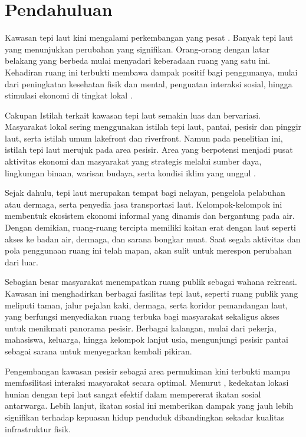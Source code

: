 \documentclass[../riset_senja.tex]{subfiles}
\begin{document}
\section{Pendahuluan}%
\label{sec:Pendahuluan}


Kawasan tepi laut kini mengalami perkembangan yang pesat \citep{tang2011}. Banyak tepi laut yang menunjukkan perubahan yang signifikan.
Orang-orang dengan latar belakang yang berbeda mulai menyadari keberadaan ruang yang satu ini. Kehadiran ruang ini terbukti membawa dampak positif bagi penggunanya, mulai dari peningkatan kesehatan fisik dan mental, penguatan interaksi sosial, hingga stimulasi ekonomi di tingkat lokal \citep{shi2025}.

Cakupan Istilah terkait kawasan tepi laut semakin luas dan bervariasi. Masyarakat lokal sering menggunakan istilah tepi laut, pantai, pesisir dan pinggir laut, serta istilah umum lakefront dan riverfront. Namun pada penelitian ini, istilah tepi laut merujuk pada area pesisir. Area yang berpotensi menjadi pusat aktivitas ekonomi dan masyarakat yang strategis melalui sumber daya, lingkungan binaan, warisan budaya, serta kondisi iklim yang unggul \citep{bhagwat1975,hoppe2011}.

Sejak dahulu, tepi laut merupakan tempat bagi nelayan, pengelola pelabuhan atau dermaga, serta penyedia jasa transportasi laut. Kelompok-kelompok ini membentuk ekosistem ekonomi informal yang dinamis dan bergantung pada air. Dengan demikian, ruang-ruang tercipta memiliki kaitan erat dengan laut seperti akses ke badan air, dermaga, dan sarana bongkar muat. Saat segala aktivitas dan pola penggunaan ruang ini telah mapan, akan sulit untuk merespon perubahan dari luar.

Sebagian besar masyarakat menempatkan ruang publik sebagai wahana rekreasi.
Kawasan ini menghadirkan berbagai fasilitas tepi laut, seperti ruang publik yang meliputi taman, jalur pejalan kaki, dermaga, serta koridor pemandangan laut, yang berfungsi menyediakan ruang terbuka bagi masyarakat sekaligus akses untuk menikmati panorama pesisir.
Berbagai kalangan, mulai dari pekerja, mahasiswa, keluarga, hingga kelompok lanjut usia, mengunjungi pesisir pantai sebagai sarana untuk menyegarkan kembali pikiran.

Pengembangan kawasan pesisir sebagai area permukiman kini terbukti mampu memfasilitasi interaksi masyarakat secara optimal. Menurut \citet{chen2026}, kedekatan lokasi hunian dengan tepi laut sangat efektif dalam mempererat ikatan sosial antarwarga. Lebih lanjut, ikatan sosial ini memberikan dampak yang jauh lebih signifikan terhadap kepuasan hidup penduduk dibandingkan sekadar kualitas infrastruktur fisik.
\end{document}
